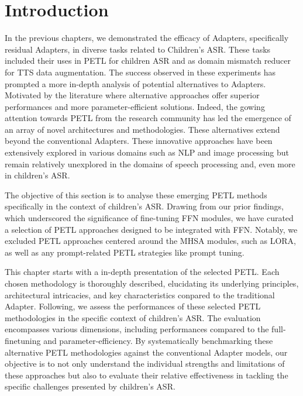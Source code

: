 \label{chap:7}
\cleardoublepage
\section{Introduction}
In the previous chapters, we demonstrated the efficacy of Adapters, specifically residual Adapters, in diverse tasks related to Children's ASR. These tasks included their uses in PETL for children ASR and as domain mismatch reducer for TTS data augmentation. The success observed in these experiments has prompted a more in-depth analysis of potential alternatives to Adapters. Motivated by the literature where alternative approaches offer superior performances and more parameter-efficient solutions.
Indeed, the gowing attention towards PETL from the research community has led the emergence of an array of novel architectures and methodologies. These alternatives extend beyond the conventional Adapters. These innovative approaches have been extensively explored in various domains such as NLP and image processing but remain relatively unexplored in the domains of speech processing and, even more in children's ASR.

The objective of this section is to analyse these emerging PETL methods specifically in the context of children's ASR. Drawing from our prior findings, which underscored the significance of fine-tuning FFN modules, we have curated a selection of PETL approaches designed to be integrated with FFN. Notably, we excluded PETL approaches centered around the MHSA modules, such as LORA, as well as any prompt-related PETL strategies like prompt tuning.

This chapter starts with a in-depth presentation of the selected PETL. Each chosen methodology is thoroughly described, elucidating its underlying principles, architectural intricacies, and key characteristics conpared to the traditional Adapter. 
Following, we assess the performances of these selected PETL methodologies  in the specific context of children's ASR. The evaluation encompasses various dimensions, including performances compared to the full-finetuning and parameter-efficiency. By systematically benchmarking these alternative PETL methodologies against the conventional Adapter models, our objective is to not only understand the individual strengths and limitations of these approaches but also to evaluate their relative effectiveness in tackling the specific challenges presented by children's ASR.

